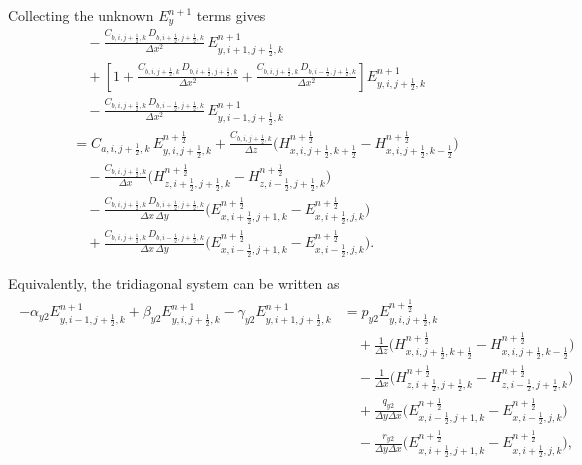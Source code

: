 \documentclass{article}
\numberwithin{equation}{section}
\numberwithin{figure}{section}
\begin{document}
Collecting the unknown $E_{y}^{n+1}$ terms gives
\begin{equation}
    \begin{aligned}
         & \quad -\frac{C_{b,i,j+\tfrac12,k}\,D_{b,i+\tfrac12,j+\tfrac12,k}}{\Delta x^2}\, E_{y,i+1,j+\tfrac12,k}^{n+1}                                                                                     \\
         & \quad + \left[1+\frac{C_{b,i,j+\tfrac12,k}\,D_{b,i+\tfrac12,j+\tfrac12,k}}{\Delta x^2} +\frac{C_{b,i,j+\tfrac12,k}\,D_{b,i-\tfrac12,j+\tfrac12,k}}{\Delta x^2}\right] E_{y,i,j+\tfrac12,k}^{n+1} \\
         & \quad - \frac{C_{b,i,j+\tfrac12,k}\,D_{b,i-\tfrac12,j+\tfrac12,k}}{\Delta x^2}\, E_{y,i-1,j+\tfrac12,k}^{n+1}                                                                                    \\
         & = C_{a,i,j+\tfrac12,k}\, E_{y,i,j+\tfrac12,k}^{n+\frac12} + \frac{C_{b,i,j+\tfrac12,k}}{\Delta z} \Big(H_{x,i,j+\tfrac12,k+\tfrac12}^{n+\frac12}-H_{x,i,j+\tfrac12,k-\tfrac12}^{n+\frac12}\Big)  \\
         & \quad - \frac{C_{b,i,j+\tfrac12,k}}{\Delta x} \Big(H_{z,i+\tfrac12,j+\tfrac12,k}^{n+\frac12}-H_{z,i-\tfrac12,j+\tfrac12,k}^{n+\frac12}\Big)                                                      \\
         & \quad - \frac{C_{b,i,j+\tfrac12,k}\,D_{b,i+\tfrac12,j+\tfrac12,k}}{\Delta x\,\Delta y} \Big(E_{x,i+\tfrac12,j+1,k}^{n+\frac12}-E_{x,i+\tfrac12,j,k}^{n+\frac12}\Big)                             \\
         & \quad + \frac{C_{b,i,j+\tfrac12,k}\,D_{b,i-\tfrac12,j+\tfrac12,k}}{\Delta x\,\Delta y} \Big(E_{x,i-\tfrac12,j+1,k}^{n+\frac12}-E_{x,i-\tfrac12,j,k}^{n+\frac12}\Big).
    \end{aligned}
\end{equation}

Equivalently, the tridiagonal system can be written as
\begin{align}
    \begin{split}
        -\alpha_{y2}E_{y,i-1,j+\tfrac12,k}^{n+1} + \beta_{y2}E_{y,i,j+\tfrac12,k}^{n+1} - \gamma_{y2}E_{y,i+1,j+\tfrac12,k}^{n+1}
         & = p_{y2}E_{y,i,j+\tfrac12,k}^{n+\frac12}                                                                               \\
         & \quad +\frac{1}{\Delta z}\Big(H_{x,i,j+\tfrac12,k+\tfrac12}^{n+\frac12}-H_{x,i,j+\tfrac12,k-\tfrac12}^{n+\frac12}\Big) \\
         & \quad -\frac{1}{\Delta x}\Big(H_{z,i+\tfrac12,j+\tfrac12,k}^{n+\frac12}-H_{z,i-\tfrac12,j+\tfrac12,k}^{n+\frac12}\Big) \\
         & \quad +\frac{q_{y2}}{\Delta y\Delta x}\Big(E_{x,i-\tfrac12,j+1,k}^{n+\frac12}-E_{x,i-\tfrac12,j,k}^{n+\frac12}\Big)    \\
         & \quad -\frac{r_{y2}}{\Delta y\Delta x}\Big(E_{x,i+\tfrac12,j+1,k}^{n+\frac12}-E_{x,i+\tfrac12,j,k}^{n+\frac12}\Big),
    \end{split}
    \label{eq:second-e-ey-adi-tridiagonal}
\end{align}
\end{document}
